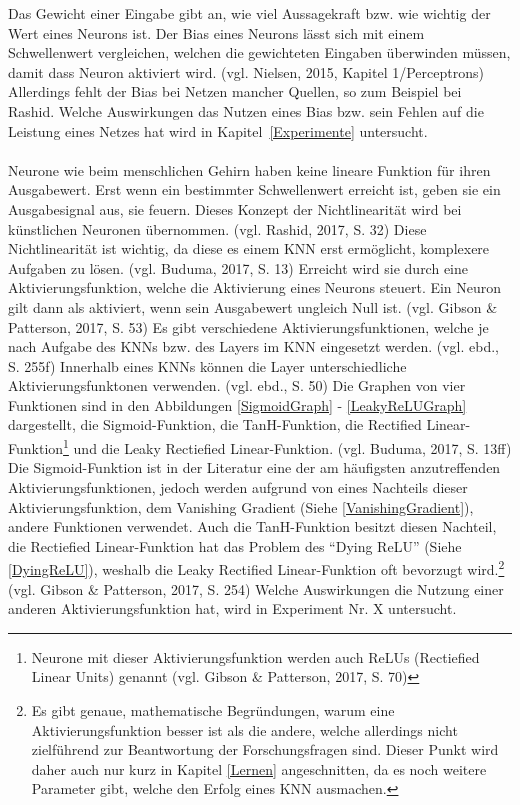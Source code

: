 \documentclass[a4paper,12pt,ngerman,oneside]{scrreprt}	%
\newcommand{\practitioner}[1]{(vgl. Gibson \& Patterson, 2017, S. {#1})}
\begin{document}
			Das Gewicht einer Eingabe gibt an, wie viel Aussagekraft bzw. wie wichtig der Wert eines Neurons ist. Der Bias eines Neurons lässt sich mit einem Schwellenwert vergleichen, welchen die gewichteten Eingaben überwinden müssen, damit dass Neuron aktiviert wird. (vgl. Nielsen, 2015, Kapitel 1/Perceptrons) Allerdings fehlt der Bias bei Netzen mancher Quellen, so zum Beispiel bei Rashid. Welche Auswirkungen das Nutzen eines Bias bzw. sein Fehlen auf die Leistung eines Netzes hat wird in \mbox{Kapitel \ref{Experimente}} untersucht.
			\ \\
			\ \\
			Neurone wie beim menschlichen Gehirn haben keine lineare Funktion für ihren Ausgabewert. Erst wenn ein bestimmter Schwellenwert erreicht ist, geben sie ein Ausgabesignal aus, sie feuern. Dieses Konzept der Nichtlinearität wird bei künstlichen Neuronen übernommen. (vgl. Rashid, 2017, S. 32) Diese Nichtlinearität ist wichtig, da diese es einem KNN erst ermöglicht, komplexere Aufgaben zu lösen. (vgl. Buduma, 2017, S. 13) Erreicht wird sie durch eine Aktivierungsfunktion, welche die Aktivierung eines Neurons steuert. Ein Neuron gilt dann als aktiviert, wenn sein Ausgabewert ungleich Null ist. (vgl. Gibson \& Patterson, 2017, S. 53) Es gibt verschiedene Aktivierungsfunktionen, welche je nach Aufgabe des KNNs bzw. des Layers im KNN eingesetzt werden. (vgl. ebd., S. 255f) Innerhalb eines KNNs können die Layer unterschiedliche Aktivierungsfunktonen verwenden. (vgl. ebd., S. 50) Die Graphen von vier Funktionen sind in den Abbildungen \ref{SigmoidGraph} - \ref{LeakyReLUGraph} dargestellt, die Sigmoid-Funktion, die TanH-Funktion, die Rectified Linear-Funktion\footnote{Neurone mit dieser Aktivierungsfunktion werden auch ReLUs (Rectiefied Linear Units) genannt \practitioner{70}} und die Leaky Rectiefied Linear-Funktion. (vgl. Buduma, 2017, S. 13ff) Die Sigmoid-Funktion ist in der Literatur eine der am häufigsten anzutreffenden Aktivierungsfunktionen, jedoch werden aufgrund von eines Nachteils dieser Aktivierungsfunktion, dem Vanishing Gradient (Siehe \ref{VanishingGradient}), andere Funktionen verwendet. Auch die TanH-Funktion besitzt diesen Nachteil, die Rectiefied Linear-Funktion hat das Problem des "`Dying ReLU"' (Siehe \ref{DyingReLU}), weshalb die Leaky Rectified Linear-Funktion oft bevorzugt wird.\footnote{Es gibt genaue, mathematische Begründungen, warum eine Aktivierungsfunktion besser ist als die andere, welche allerdings nicht zielführend zur Beantwortung der Forschungsfragen sind. Dieser Punkt wird daher auch nur kurz in Kapitel \ref{Lernen} angeschnitten, da es noch weitere Parameter gibt, welche den Erfolg eines KNN ausmachen.} (vgl. Gibson \& Patterson, 2017, S. 254) Welche Auswirkungen die Nutzung einer anderen Aktivierungsfunktion hat, wird in Experiment Nr. X untersucht. 
			
\end{document}
